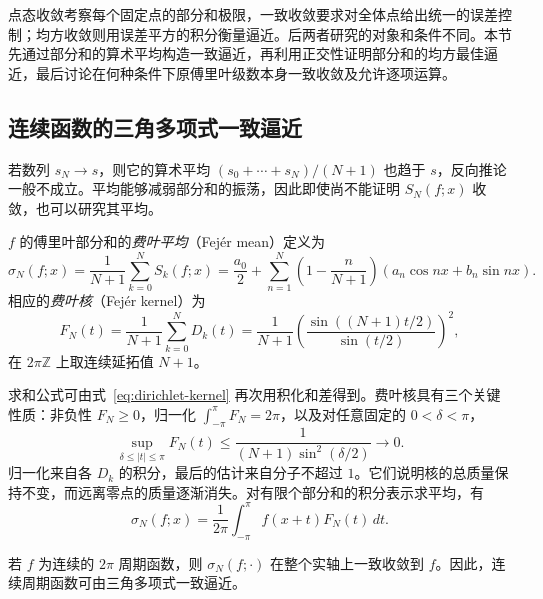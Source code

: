 \documentclass[UTF8,12pt,a4paper,fontset=fandol]{ctexbook}
\begin{document}
点态收敛考察每个固定点的部分和极限，一致收敛要求对全体点给出统一的误差控制；均方收敛则用误差平方的积分衡量逼近。后两者研究的对象和条件不同。本节先通过部分和的算术平均构造一致逼近，再利用正交性证明部分和的均方最佳逼近，最后讨论在何种条件下原傅里叶级数本身一致收敛及允许逐项运算。

\subsection{连续函数的三角多项式一致逼近}
\label{subsec:uniform-trigonometric-approximation}

若数列 $s_N\to s$，则它的算术平均 $(s_0+\cdots+s_N)/(N+1)$ 也趋于 $s$，反向推论一般不成立。平均能够减弱部分和的振荡，因此即使尚不能证明 $S_N(f;x)$ 收敛，也可以研究其平均。

\begin{definition}
\label{def:fejer-means-and-kernel}
$f$ 的傅里叶部分和的\emph{费叶平均}（Fej\'er mean）定义为
\begin{equation}
    \sigma_N(f;x)=\frac1{N+1}\sum_{k=0}^NS_k(f;x)
       =\frac{a_0}{2}+\sum_{n=1}^N
           \left(1-\frac n{N+1}\right)
                        (a_n\cos nx+b_n\sin nx).
    \label{eq:fejer-means}
\end{equation}
相应的\emph{费叶核}（Fej\'er kernel）为
\begin{equation}
    F_N(t)=\frac1{N+1}\sum_{k=0}^ND_k(t)
       =\frac1{N+1}
             \left(\frac{\sin((N+1)t/2)}{\sin(t/2)}\right)^2,
    \label{eq:fejer-kernel}
\end{equation}
在 $2\pi\mathbb Z$ 上取连续延拓值 $N+1$。
\end{definition}

求和公式可由式~\eqref{eq:dirichlet-kernel} 再次用积化和差得到。费叶核具有三个关键性质：非负性 $F_N\geq0$，归一化 $\int_{-\pi}^{\pi}F_N=2\pi$，以及对任意固定的 $0<\delta<\pi$，
\begin{equation}
    \sup_{\delta\leq|t|\leq\pi}F_N(t)
       \leq\frac1{(N+1)\sin^2(\delta/2)}\longrightarrow0.
    \label{eq:fejer-kernel-concentration}
\end{equation}
归一化来自各 $D_k$ 的积分，最后的估计来自分子不超过 $1$。它们说明核的总质量保持不变，而远离零点的质量逐渐消失。对有限个部分和的积分表示求平均，有
\begin{equation}
    \sigma_N(f;x)=\frac1{2\pi}\int_{-\pi}^{\pi}
                                     f(x+t)F_N(t)\,dt.
    \label{eq:fejer-convolution}
\end{equation}

\begin{theorem}[费叶定理与魏尔斯特拉斯第二逼近定理]
\label{thm:fejer-uniform-approximation}
若 $f$ 为连续的 $2\pi$ 周期函数，则 $\sigma_N(f;\cdot)$ 在整个实轴上一致收敛到 $f$。因此，连续周期函数可由三角多项式一致逼近。
\end{theorem}
\end{document}
